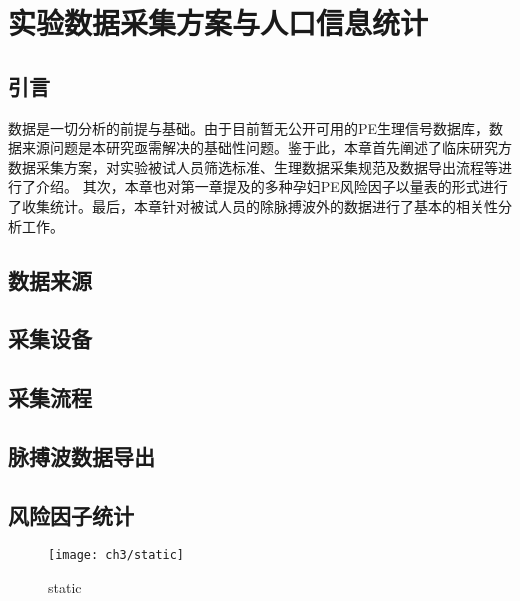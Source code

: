 \chapter{实验数据采集方案与人口信息统计}
\section{引言}
数据是一切分析的前提与基础。由于目前暂无公开可用的PE生理信号数据库，数据来源问题是本研究亟需解决的基础性问题。鉴于此，本章首先阐述了临床研究方数据采集方案，对实验被试人员筛选标准、生理数据采集规范及数据导出流程等进行了介绍。
其次，本章也对第一章提及的多种孕妇PE风险因子以量表的形式进行了收集统计。最后，本章针对被试人员的除脉搏波外的数据进行了基本的相关性分析工作。
\section{数据来源}
\section{采集设备}
\section{采集流程}
\section{脉搏波数据导出}
\section{风险因子统计}
\begin{figure}[htbp]
    \centering
    \texttt{[image: ch3/static]}
    \caption{\label{fig:static}static}
\end{figure}


